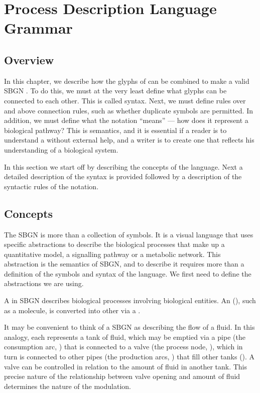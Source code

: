 \chapter{Process Description Language Grammar}
\label{chp:grammar}

\section{Overview}

In this chapter, we describe how the glyphs of \SBGNPDLone can be combined
to make a valid SBGN \PDm. To do this, we must at the very least
define what glyphs can be connected to each other. This is called
syntax. Next, we must define rules over and above connection rules,
such as whether duplicate symbols are permitted. In addition, we must define what the notation ``means'' --- how does it represent a biological pathway? This is semantics, and it is essential if a reader is to understand a \PDm without external help, and a writer is to create one that reflects his understanding of a biological system.

In this section we start off by describing the concepts of the
\PD{} language. Next a detailed description of the syntax is provided
followed by a description of the syntactic rules of the notation.

\section{Concepts}

The SBGN \PDl{} is more than a collection of symbols. It is a
visual language that uses specific abstractions to describe the
biological processes that make up a quantitative model, a signalling pathway or a metabolic network. This abstraction is the
semantics of SBGN, and to describe it requires more than a definition
of the symbols and syntax of the language. We first need to define the
abstractions we are using.

A \PD{} in SBGN describes biological processes involving biological entities. An  (), such as a molecule, is converted into other  via a . 

It may be convenient to think of a SBGN \PD{} as describing the
flow of a fluid. In this analogy, each  represents a
tank of fluid, which may be emptied via a pipe (the consumption arc, ) 
that is connected to a valve (the process node, ), which in turn is
connected to other pipes (the production arcs, ) that fill other tanks
(). A valve can be
controlled in relation to the amount of fluid in another tank.  This
precise nature of the relationship between valve opening and amount of
fluid determines the nature of the modulation.

